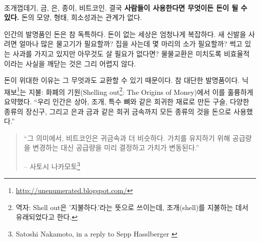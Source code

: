 \paragraph{}
\begin{comment}
Seashells, gold, silver, paper, bitcoin. In the end, \textbf{money is whatever
people use as money}, no matter its shape and form, or lack thereof.
\end{comment}
조개껍데기, 금, 은, 종이, 비트코인. 결국 \textbf{사람들이 사용한다면 무엇이든 돈이 될 수 있다.}
돈의 모양, 형태, 희소성과는 관계가 없다.

\begin{comment}
Money, as an invention, is ingenious. 
A world without money is insanely
complicated: How many fish will buy me new shoes? How many cows will buy
me a house? What if I don't need anything right now but I need to get
rid of my soon-to-be rotten apples? You don't need a lot of imagination
to realize that a barter economy is maddeningly inefficient.
\end{comment}
인간의 발명품인 돈은 참 독특하다. 
돈이 없는 세상은 엄청나게 복잡하다. 
새 신발을 사려면 얼마나 많은 물고기가 필요할까? 
집을 사는데 몇 마리의 소가 필요할까? 
썩고 있는 사과를 가지고 있지만 아무것도 살 필요가 없다면? 
물물교환은 미치도록 비효율적이라는 사실을 깨닫는 것은 그리 어렵지 않다.

\begin{comment}
The great thing about money is that it can be exchanged for \textit{anything
else} --- that's quite the invention! As Nick
Szabo\footnote{\url{http://unenumerated.blogspot.com/}} brilliantly summarizes
in \textit{Shelling Out: The Origins of Money} \cite{shelling-out}, we humans
have used all kinds of things as money: beads made of rare materials like ivory,
shells, or special bones, various kinds of jewelry, and later on rare metals
like silver and gold.
\end{comment}
돈이 위대한 이유는 그 무엇과도 교환할 수 있기 때문이다. 
참 대단한 발명품이다. 
닉 재보\footnote{\url{http://unenumerated.blogspot.com/}}는 
지불: 화폐의 기원(Shelling out\footnote{역자: Shell out은 '지불하다.'라는 뜻으로 쓰이는데, 조개(shell)를 지불하는 데서 유래되었다고 한다.}: The Origins of Money)\cite{shelling-out}에서 이를 훌륭하게 요약했다.
\enquote{우리 인간은 상아, 조개, 특수 뼈와 같은 희귀한 재료로 만든 구슬, 다양한 종류의 장신구, 
그리고 은과 금과 같은 희귀 금속까지 모든 종류의 것을 돈으로 사용했다.}

\begin{quotation}\begin{samepage}
\enquote{그 의미에서, 비트코인은 귀금속과 더 비슷하다. 가치를 유지하기 위해 공급량을 변경하는 대신
 공급량을 미리 결정하고 가치가 변동된다.}
\begin{flushright} -- 사토시 나카모토\footnote{Satoshi Nakamoto, in a reply to Sepp
Hasslberger \cite{satoshi-precious-metal}}
\end{flushright}\end{samepage}\end{quotation}

